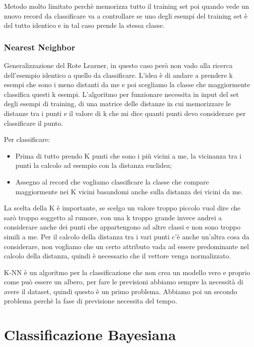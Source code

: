 \documentclass[14pt]{extreport}
\begin{document}
Metodo molto limitato perchè memorizza tutto il training set poi quando vede un nuovo record da classificare va a controllare se uno degli esempi del training set è del tutto identico e in tal caso prende la stessa classe.

\subsubsection{Nearest Neighbor}

Generalizzazione del Rote Learner, in questo caso però non vado alla ricerca dell'esempio identico a quello da classificare.
L'idea è di andare a prendere k esempi che sono i meno distanti da me e poi scegliamo la classe che maggiormente classifica questi k esempi.
L'algoritmo per funzionare necessita in input del set degli esempi di training, di una matrice delle distanze in cui memorizzare le distanze tra i punti e il valore di k che mi dice quanti punti devo considerare per classificare il punto.

Per classificare:
\begin{itemize}
    \item Prima di tutto prendo K punti che sono i più vicini a me, la vicinanza tra i punti la calcolo ad esempio con la distanza euclidea;
    \item Assegno al record che vogliamo classificare la classe che compare maggiormente nei K vicini basandomi anche sulla distanza dei vicini da me.
\end{itemize}

La scelta della K è importante, se scelgo un valore troppo piccolo vuol dire che sarò troppo soggetto al rumore, con una k troppo grande invece andrei a considerare anche dei punti che appartengono ad altre classi e non sono troppo simili a me.
Per il calcolo della distanza tra i vari punti c'è anche un'altra cosa da considerare, non vogliamo che un certo attributo vada ad essere predominante nel calcolo della distanza, quindi è necessario che il vettore venga normalizzato.

K-NN è un algoritmo per la classificazione che non crea un modello vero e proprio come può essere un albero, per fare le previsioni abbiamo sempre la necessità di avere il dataset, quindi questo è un primo problema. Abbiamo poi un secondo problema perchè la fase di previsione necessita del tempo.

\section{Classificazione Bayesiana}
\end{document}
